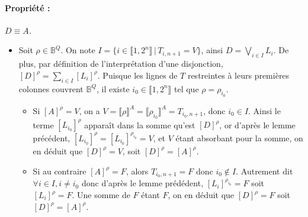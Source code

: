 \documentclass{scrartcl}
\newcommand{\prop}[1]{\paragraph{Propriété : } \textsl{#1}\\}
\newenvironment{demo}{\begin{itemize}[label=$\triangleright$]\item }{\end{itemize}}
\newcommand{\set}[1]{\{#1\}}
\newcommand{\tq}{\, \big| \,}
\newcommand{\intset}[1]{\llbracket #1 \rrbracket}
\begin{document}
				\prop{$D \equiv A$.}
				\begin{demo}
					Soit $\rho \in \mathbb{B}^Q$. On note $I = \set{i \in \intset{1,2^n} \tq T_{i,n+1} = V}$, ainsi $D = \bigvee_{i\in I} L_i$.
					De plus, par définition de l'interprétation d'une disjonction, $[D]^\rho = \sum_{i\in I} [L_i]^\rho$.
					Puisque les lignes de $T$ restreintes à leurs premières colonnes couvrent $\mathbb{B}^Q$, il existe $i_0 \in \intset{1,2^n}$ tel que $\rho = \rho_{i_0}$.
					\begin{itemize}
						\item Si $[A]^\rho = V$, on a $V = \intset{\rho}^A = \intset{\rho_{i_0}}^A = T_{i_0,n+1}$, donc $i_0 \in I$. 
						Ainsi le terme $[L_{i_0}]^\rho$ apparaît dans la somme qu'est $[D]^\rho$, or d'après le lemme précédent, $[L_{i_0}]^\rho = [L_{i_0}]^{\rho_{i_0}} = V$,
						et $V$ étant absorbant pour la somme, on en déduit que $[D]^\rho = V$, soit $[D]^\rho = [A]^\rho$.
						\item Si au contraire $[A]^\rho = F$, alors $T_{i_0,n+1} = F$ donc $i_0\not\in I$. Autrement dit $\forall i \in I, i\neq i_0$ donc d'après le lemme prédédent,
						$[L_i]^{\rho_{i_0}} = F$ soit $[L_i]^\rho = F$. Une somme de $F$ étant $F$, on en déduit que $[D]^\rho = F$ soit $[D]^\rho = [A]^\rho$.
					\end{itemize}
				\end{demo}
\end{document}
